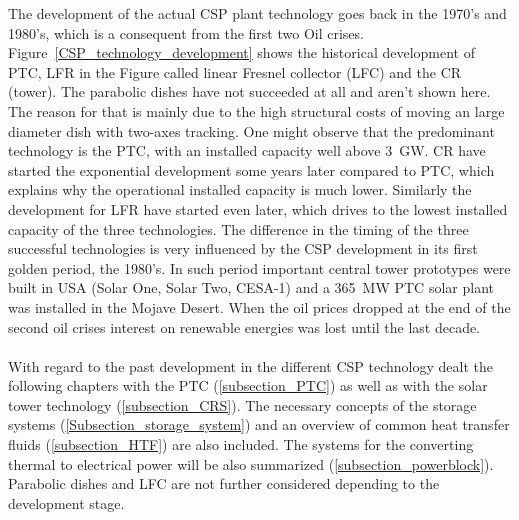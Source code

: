 \documentclass[Master,MEE,english]{twbook}%
\begin{document}
The development of the actual CSP plant technology goes back in the 1970's and 1980's, which is a consequent from the first two Oil crises. Figure~\ref{CSP_technology_development} shows the historical development of PTC, LFR in the Figure called linear Fresnel collector (LFC) and the CR (tower). The parabolic dishes have not succeeded at all and aren't shown here. The reason for that is mainly due to the high structural costs of moving an large diameter dish with two-axes tracking. One might observe that the predominant technology is the PTC, with an installed capacity well above 3~GW. CR have started the exponential development some years later compared to PTC, which explains why the operational installed capacity is much lower. Similarly the development for LFR have started even later, which drives to the lowest installed capacity of the three technologies. The difference in the timing of the three successful technologies is very influenced by the CSP development in its first golden period, the 1980's. In such period important central tower prototypes were built in USA (Solar One, Solar Two, CESA-1) and a 365~MW PTC solar plant was installed in the Mojave Desert. When the oil prices dropped at the end of the second oil crises interest on renewable energies was lost until the last decade. \\
\\
With regard to the past development in the different CSP technology dealt the following chapters with the PTC (\ref{subsection_PTC}) as well as with the solar tower technology (\ref{subsection_CRS}). The necessary concepts of the storage systems (\ref{Subsection_storage_system}) and an overview of common heat transfer fluids (\ref{subsection_HTF}) are also included. The systems for the converting thermal to electrical power will be also summarized (\ref{subsection_powerblock}).  Parabolic dishes and LFC are not further considered depending to the development stage.
\pagebreak
\end{document}
